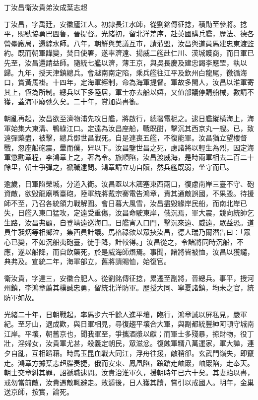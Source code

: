 
\begin{pinyinscope}
丁汝昌衛汝貴弟汝成葉志超

丁汝昌，字禹廷，安徽廬江人。初隸長江水師，從劉銘傳征捻，積勛至參將。捻平，賜號協勇巴圖魯，晉提督。光緒初，留北洋差序，赴英國購兵艦，歷法、德各營壘廠局，還綜水師。八年，朝鮮與美議互市，請蒞盟，汝昌與道員馬建忠東渡監約。既而朝軍譁變，焚日使署，遂率濟遠、揚威二艦赴仁川、漢城護商，而日軍已先至，汝昌還請益師。隨統七艦以濟，薄王京，與吳長慶及建忠謁李應罡，執以歸。九年，授天津鎮總兵。會越南南定陷，乘兵艦往江平及欽州白龍尾，徼循海口，賞黃馬褂。十四年，定海軍經制，命為海軍提督。軍故多閩人，汝昌以淮軍寄其上，恆為所制。總兵以下多陸居，軍士亦去船以嬉，又值部議停購船械，數請不獲，蓋海軍廢弛久矣。二十年，賞加尚書銜。

朝亂再起，汝昌欲至濟物浦先攻日艦，將啟行，總署電柅之。逮日艦縱橫海上，海軍始集大東溝、鴨綠江口。定遠為汝昌座船，戰既酣，擊沉其西京丸一艘。已，致遠彈藥盡，被擊，總兵鄧世昌戰死。自是連喪五艦，不復能軍。汝昌猶立望樓督戰，忽座船砲震，暈而僕，舁以下。汝昌鑒世昌之死，慮諸將以輕生為烈，因定海軍懲勸章程，李鴻章上之，著為令。旅順陷，汝昌渡威海，是時兩軍相去二百二十餘里，朝士爭彈之，褫職逮問。鴻章請立功自贖，然兵艦既弱，坐守而已。

逾歲，日軍陷榮城，分道入衛。汝昌亟以木簰塞東西兩口，復慮南岸三臺不守、砲資敵，欲毀龍廟嘴臺砲，陸軍統將戴宗騫電告鴻章，責其通敵誤國，不果毀。待援師不至，乃召各統領力戰解圍。會日暮大風雪，汝昌盡毀緣岸民船，而南北岸已失，日艦入東口猛攻，定遠受重傷，汝昌命駛東岸，俄沉焉，軍大震，競向統帥乞生路，汝昌弗顧，自登靖遠巡海口。日艦宵入口門，擊沉來遠、威遠，眾益恐。道員牛昶炳等相鄉泣，集西員計議。馬格祿欲以眾挾汝昌，德人瑞乃爾潛告曰：「眾心已變，不如沉船夷砲臺，徒手降，計較得。」汝昌從之，令諸將同時沉船，不應，遂以船降，而自飲藥死，於是威海師熸焉。事聞，諸將皆被恤，汝昌以獲譴，典弗及。宣統二年，海軍部立，舊將請賜恤，始復官。

衛汝貴，字達三，安徽合肥人。從劉銘傳征捻，累遷至副將，晉總兵。事平，授河州鎮，李鴻章薦其樸誠忠勇，留統北洋防軍。歷授大同、寧夏諸鎮，均未之官，統防軍如故。

光緒二十年，日朝戰起，率馬步六千餘人進平壤，臨行，鴻章誡以屏私見，嚴軍紀。至牙山，退成歡，與日軍相見，尋復趨平壤合大軍，與副都統豐紳阿頓守城南江岸。平壤，朝舊京也，聞我軍至，爭攜酒漿以獻；而軍士多殘暴，掠財物，役丁壯，淫婦女，汝貴軍尤甚，殺義定朝民，眾滋忿。復蝕軍糈八萬運家，軍大譁，連夕自亂，互相蹈藉。時馬玉昆血戰大同江，浮舟往援，敵稍卻。玄武門嶺失，即竄走。鴻章方據葉志超牒奏捷，俄而安東、鳳凰陷，踉蹌走岫巖，岫巖陷，走奉天。朝士交章糾其罪，詔褫職逮問。汝貴治淮軍久，援朝時年已六十矣。其妻貽以書，戒勿當前敵，汝貴遇敵輒避走。敗遁後，日人獲其牘，嘗引以戒國人。明年，金巢送京師，按實，論死。


\end{pinyinscope}
